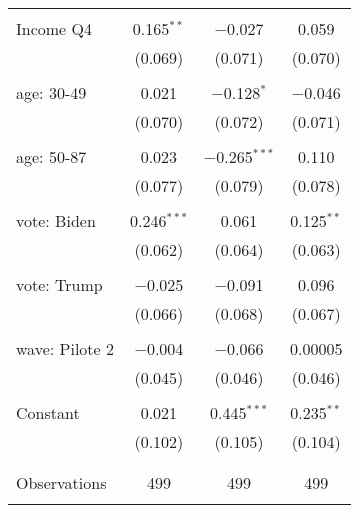 \begin{tabular}{@{\extracolsep{5pt}}lccc}
  & & & \\ 
 Income Q4 & 0.165$^{**}$ & $-$0.027 & 0.059 \\ 
  & (0.069) & (0.071) & (0.070) \\ 
  & & & \\ 
 age: 30-49 & 0.021 & $-$0.128$^{*}$ & $-$0.046 \\ 
  & (0.070) & (0.072) & (0.071) \\ 
  & & & \\ 
 age: 50-87 & 0.023 & $-$0.265$^{***}$ & 0.110 \\ 
  & (0.077) & (0.079) & (0.078) \\ 
  & & & \\ 
 vote: Biden & 0.246$^{***}$ & 0.061 & 0.125$^{**}$ \\ 
  & (0.062) & (0.064) & (0.063) \\ 
  & & & \\ 
 vote: Trump & $-$0.025 & $-$0.091 & 0.096 \\ 
  & (0.066) & (0.068) & (0.067) \\ 
  & & & \\ 
 wave: Pilote 2 & $-$0.004 & $-$0.066 & 0.00005 \\ 
  & (0.045) & (0.046) & (0.046) \\ 
  & & & \\ 
 Constant & 0.021 & 0.445$^{***}$ & 0.235$^{**}$ \\ 
  & (0.102) & (0.105) & (0.104) \\ 
  & & & \\ 
\hline \\[-1.8ex] 

Observations & 499 & 499 & 499 \\ 
\hline 
\hline \\[-1.8ex] 
\end{tabular} 
